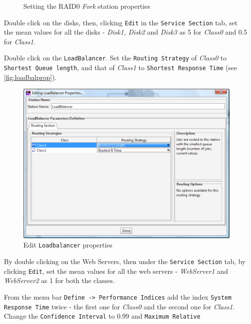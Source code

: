 \begin{itemize*}
\begin{figure}[htb]
\begin{center}
    \end{center}
    \caption{Setting the RAID0 \emph{Fork} station properties}
    \label{fig:raid0prop}
\end{figure}

\item Double click on the disks, then, clicking \texttt{Edit} in
the \texttt{Service Section} tab, set the mean values for all the
disks - \emph{Disk1, Disk2} and \emph{Disk3} as 5 for
\emph{Class0} and 0.5 for \emph{Class1}.

\item Double click on the \texttt{LoadBalancer}. Set the
\texttt{Routing Strategy} of \emph{Class0} to \texttt{Shortest
Queue length}, and that of \emph{Class1} to \texttt{Shortest
Response Time} (see \autoref{fig:loadbalprop}).
\begin{figure}[htb]
    \begin{center}
        \includegraphics[scale=.5]{img/jsimg/12.22.eps}
    \end{center}
    \caption{Edit \texttt{Loadbalancer} properties}
    \label{fig:loadbalprop}
\end{figure}
\item By double clicking on the Web Servers, then under the
\texttt{Service Section} tab, by clicking \texttt{Edit}, set the
mean values for all the web servers - \emph{WebServer1} and
\emph{WebServer2} as 1 for both the classes. \item From the menu
bar \texttt{Define -> Performance Indices} add the index
\texttt{System Response Time} twice - the first one for
\emph{Class0} and the second one for \emph{Class1}. Change the
\texttt{Confidence Interval} to 0.99 and \texttt{Maximum Relative
}
\end{itemize*}
